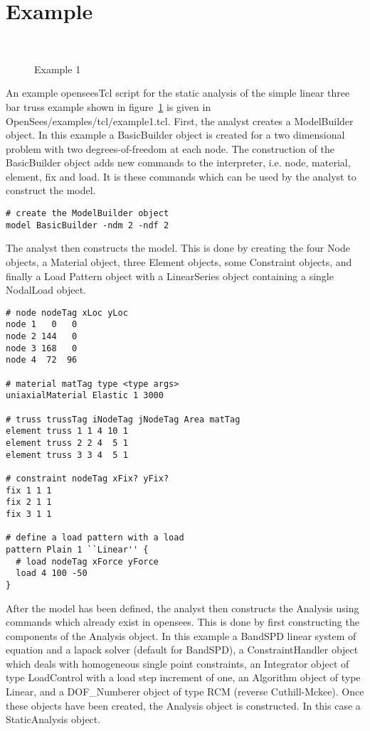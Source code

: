 \documentclass[12pt]{article}
\begin{document}
\section{Example}

\begin{figure}[htpb]
\begin{center}
\leavevmode
\hbox{%
}
\end{center}
\caption{Example 1}
\label{example1}
\end{figure}

\noindent An example openseesTcl script for the static analysis of the
simple linear three bar truss example shown in figure~\ref{example1} is
given in {\sf OpenSees/examples/tcl/example1.tcl}. First, the analyst creates a
ModelBuilder object. In this example a BasicBuilder object is
created for a two dimensional problem with two degrees-of-freedom at each
node. The construction of the BasicBuilder object adds new
commands to the interpreter, i.e. node, material, element, fix and
load. It is these commands which can be used by the analyst to
construct the model. 

{\sf\small \begin{verbatim}
# create the ModelBuilder object
model BasicBuilder -ndm 2 -ndf 2
\end{verbatim} }

The analyst then constructs the model. This is done by creating
the four Node objects, a Material object, three Element objects, some
Constraint objects, and finally a Load Pattern object with a
LinearSeries object containing a single NodalLoad object. 

{\sf\small \begin{verbatim}
# node nodeTag xLoc yLoc
node 1   0   0 
node 2 144   0 
node 3 168   0
node 4  72  96

# material matTag type <type args>
uniaxialMaterial Elastic 1 3000

# truss trussTag iNodeTag jNodeTag Area matTag
element truss 1 1 4 10 1
element truss 2 2 4  5 1
element truss 3 3 4  5 1

# constraint nodeTag xFix? yFix?
fix 1 1 1
fix 2 1 1
fix 3 1 1

# define a load pattern with a load
pattern Plain 1 ``Linear'' {
  # load nodeTag xForce yForce
  load 4 100 -50
}
\end{verbatim} }

After the model has been defined, the analyst then constructs the
Analysis using commands which already exist in opensees. This is done by
first constructing the components of the Analysis object. In this
example a BandSPD linear system of equation and a lapack solver
(default for BandSPD), a ConstraintHandler object which deals with
homogeneous single point constraints, an Integrator object of type
LoadControl with a load step increment of one, an Algorithm object of
type Linear, and a DOF\_Numberer object of type RCM (reverse
Cuthill-Mckee). Once these objects have been created, the Analysis
object is constructed. In this case a StaticAnalysis object.
\end{document}
